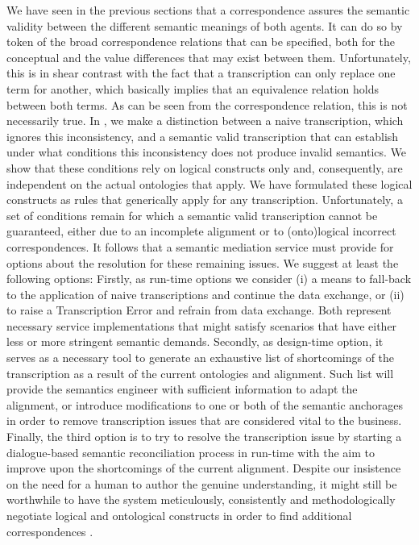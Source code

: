 \documentclass[sort&compress,preprint,authoryear,3p,twocolumn]{elsarticle}
\begin{document}
We have seen in the previous sections that a correspondence assures the
semantic validity between the different semantic meanings of both
agents. It can do so by token of the broad correspondence relations that
can be specified, both for the conceptual and the value differences that
may exist between them. Unfortunately, this is in shear contrast with
the fact that a transcription can only replace one term for another,
which basically implies that an equivalence relation holds between both
terms. As can be seen from the correspondence relation, this is not
necessarily true. In \citep{Brandt2018b}, we make a distinction between
a naive transcription, which ignores this inconsistency, and a semantic
valid transcription that can establish under what conditions this
inconsistency does not produce invalid semantics. We show that these
conditions rely on logical constructs only and, consequently, are
independent on the actual ontologies that apply. We have formulated
these logical constructs as rules that generically apply for any
transcription. Unfortunately, a set of conditions remain for which a
semantic valid transcription cannot be guaranteed, either due to an
incomplete alignment or to (onto)logical incorrect correspondences. It
follows that a semantic mediation service must provide for options about
the resolution for these remaining issues. We suggest at least the
following options: Firstly, as run-time options we consider (i) a means
to fall-back to the application of naive transcriptions and continue the
data exchange, or (ii) to raise a Transcription Error and refrain from
data exchange. Both represent necessary service implementations that
might satisfy scenarios that have either less or more stringent semantic
demands. Secondly, as design-time option, it serves as a necessary tool
to generate an exhaustive list of shortcomings of the transcription as a
result of the current ontologies and alignment. Such list will provide
the semantics engineer with sufficient information to adapt the
alignment, or introduce modifications to one or both of the semantic
anchorages in order to remove transcription issues that are considered
vital to the business. Finally, the third option is to try to resolve
the transcription issue by starting a dialogue-based semantic
reconciliation process in run-time with the aim to improve upon the
shortcomings of the current alignment. Despite our insistence on the
need for a human to author the genuine understanding, it might still be
worthwhile to have the system meticulously, consistently and
methodologically negotiate logical and ontological constructs in order
to find additional correspondences \citep{Diggelen:2007vd}.
\end{document}
